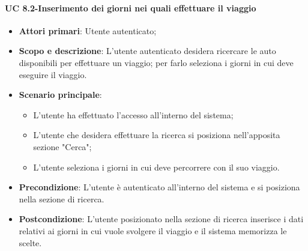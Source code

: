          \paragraph{UC 8.2-Inserimento dei giorni nei quali effettuare il viaggio}
       \begin{itemize}
        \item \textbf{Attori primari}: Utente autenticato;
       
        \item \textbf{Scopo e descrizione}: L'utente autenticato desidera ricercare le auto disponibili per effettuare un viaggio; per farlo seleziona i giorni in cui deve eseguire il viaggio.
        \item \textbf{Scenario principale}:
            \begin{itemize}
                \item L'utente ha effettuato l'accesso all'interno del sistema;
                \item L'utente che desidera effettuare la ricerca si posiziona nell'apposita sezione "Cerca";
                \item L'utente seleziona i giorni in cui deve percorrere con il suo viaggio.
            \end{itemize}
        
        \item \textbf{Precondizione}: L'utente è autenticato all'interno del sistema e si posiziona nella sezione di ricerca.
        \item \textbf{Postcondizione}: L'utente posizionato nella sezione di ricerca inserisce i dati relativi ai giorni in cui vuole svolgere il viaggio e il sistema memorizza le scelte.
        \end{itemize}
        
        
